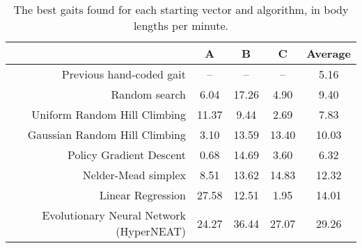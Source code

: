 \begin{table*}
\begin{center}
\begin{tabular}{|r|c|c|c||c|}
\hline
                                         & A       & B      & C      &  Average \\
\hline                                                               
\hline                                                               
Previous hand-coded gait                 & --      & --     & --     &  5.16 \\
\hline                                                                 
Random search                            & 6.04    & 17.26  & 4.90   &  9.40 \\
\hline                                                                 
Uniform Random Hill Climbing             & 11.37   & 9.44   & 2.69   &  7.83 \\
\hline                                                                 
Gaussian Random Hill Climbing            & 3.10    & 13.59  & 13.40  &  10.03 \\
\hline                                                                 
Policy Gradient Descent                  & 0.68    & 14.69  & 3.60   &  6.32 \\
\hline                                                                 
Nelder-Mead simplex                      & 8.51    & 13.62  & 14.83  &  12.32 \\
\hline                                                                 
Linear Regression                        & 27.58   & 12.51  & 1.95   &  14.01 \\
\hline                                                                
Evolutionary Neural Network (HyperNEAT)  & 24.27     & 36.44    & 27.07   & 29.26  \\
\hline
\end{tabular}
\caption{The best gaits found for each starting vector and algorithm,
  in body lengths per minute.}
\end{center}
\end{table*}



